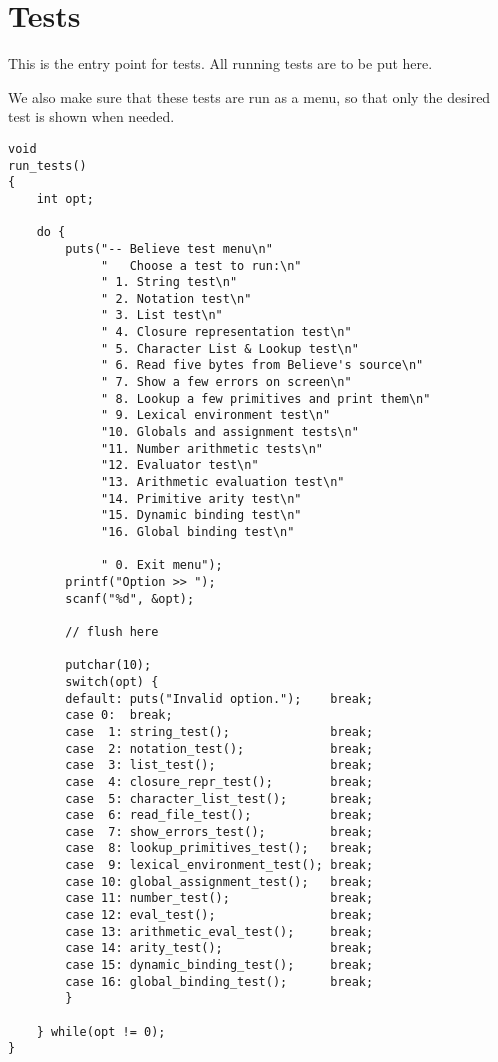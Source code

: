 \documentclass[openright,a4paper,twoside,12pt]{memoir}
\begin{document}
\section{Tests}
\label{sec:org1ad359a}

This is the entry point for tests. All running tests are to be put
here.

We also make sure that these tests are run as a menu, so that only the
desired test is shown when needed.

\begin{verbatim}
void
run_tests()
{
    int opt;

    do {
        puts("-- Believe test menu\n"
             "   Choose a test to run:\n"
             " 1. String test\n"
             " 2. Notation test\n"
             " 3. List test\n"
             " 4. Closure representation test\n"
             " 5. Character List & Lookup test\n"
             " 6. Read five bytes from Believe's source\n"
             " 7. Show a few errors on screen\n"
             " 8. Lookup a few primitives and print them\n"
             " 9. Lexical environment test\n"
             "10. Globals and assignment tests\n"
             "11. Number arithmetic tests\n"
             "12. Evaluator test\n"
             "13. Arithmetic evaluation test\n"
             "14. Primitive arity test\n"
             "15. Dynamic binding test\n"
             "16. Global binding test\n"
             
             " 0. Exit menu");
        printf("Option >> ");
        scanf("%d", &opt);

        // flush here

        putchar(10);
        switch(opt) {
        default: puts("Invalid option.");    break;
        case 0:  break;
        case  1: string_test();              break;
        case  2: notation_test();            break;
        case  3: list_test();                break;
        case  4: closure_repr_test();        break;
        case  5: character_list_test();      break;
        case  6: read_file_test();           break;
        case  7: show_errors_test();         break;
        case  8: lookup_primitives_test();   break;
        case  9: lexical_environment_test(); break;
        case 10: global_assignment_test();   break;
        case 11: number_test();              break;
        case 12: eval_test();                break;
        case 13: arithmetic_eval_test();     break;
        case 14: arity_test();               break;
        case 15: dynamic_binding_test();     break;
        case 16: global_binding_test();      break;
        }
        
    } while(opt != 0);
}
\end{verbatim}
\end{document}
